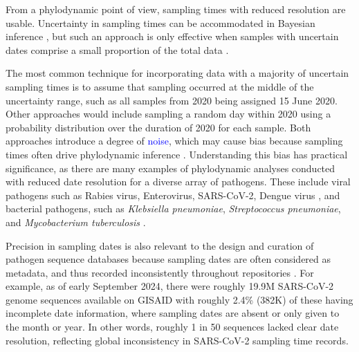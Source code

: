 \documentclass[12pt]{article}
\begin{document}
\begin{spacing}{2}
From a phylodynamic point of view, sampling times with reduced resolution are usable. Uncertainty in sampling times can be accommodated in Bayesian inference \citep{shapiro2011bayesian}, but such an approach is only effective when samples with uncertain dates comprise a small proportion of the total data \citep{rieux2017tipdatingbeast}.

The most common technique for incorporating data with a majority of uncertain sampling times is to assume that sampling occurred at the middle of the uncertainty range, such as all samples from 2020 being assigned 15 June 2020. Other approaches would include sampling a random day within 2020 using a probability distribution over the duration of 2020 for each sample. Both approaches introduce a degree of \textcolor{blue}{noise}, which may cause bias because sampling times often drive phylodynamic inference \citep{featherstone_decoding_2023,featherstone_infectious_2021,volz_sampling_2014}. Understanding this bias has practical significance, as there are many examples of phylodynamic analyses conducted with reduced date resolution for a diverse array of pathogens. These include viral pathogens such as Rabies virus, Enterovirus, SARS-CoV-2, Dengue virus \citep{talbi_phylodynamics_2010,xiao_genomic_2022,wolf_temporal_2022,bennett_epidemic_2010}, and bacterial pathogens, such as \textit{Klebsiella pneumoniae}, \textit{Streptococcus pneumoniae}, and \textit{Mycobacterium tuberculosis} \citep{cella_multi-drug_2017,azarian_impact_2018,merker_evolutionary_2015}. 

Precision in sampling dates is also relevant to the design and curation of pathogen sequence databases because sampling dates are often considered as metadata, and thus recorded inconsistently throughout repositories \citep{raza2016big}. For example, as of early September 2024, there were roughly 19.9M SARS-CoV-2 genome sequences available on GISAID with roughly 2.4\% (382K) of these having incomplete date information, where sampling dates are absent or only given to the month or year. In other words, roughly 1 in 50 sequences lacked clear date resolution, reflecting global inconsistency in SARS-CoV-2 sampling time records.


\end{spacing}
\end{document}
